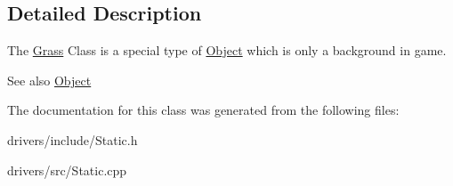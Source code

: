 \subsection{Detailed Description}
The \hyperlink{classGrass}{Grass} Class is a special type of \hyperlink{classObject}{Object} which is only a background in game. 

\begin{DoxySeeAlso}{See also}
\hyperlink{classObject}{Object} 
\end{DoxySeeAlso}


The documentation for this class was generated from the following files\+:\begin{DoxyCompactItemize}
\item 
drivers/include/Static.\+h\item 
drivers/src/Static.\+cpp\end{DoxyCompactItemize}
